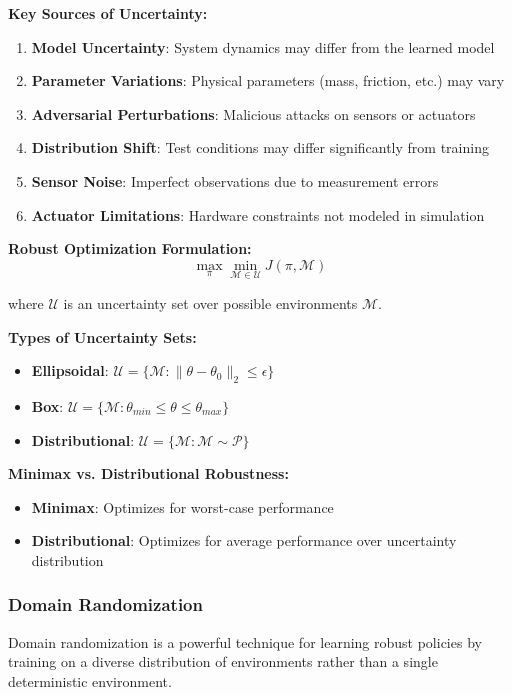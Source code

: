 \documentclass[12pt]{article}
\begin{document}
{{{{\textbf{Key Sources of Uncertainty:}
\begin{enumerate}
\item \textbf{Model Uncertainty}: System dynamics may differ from the learned model
\item \textbf{Parameter Variations}: Physical parameters (mass, friction, etc.) may vary
\item \textbf{Adversarial Perturbations}: Malicious attacks on sensors or actuators
\item \textbf{Distribution Shift}: Test conditions may differ significantly from training
\item \textbf{Sensor Noise}: Imperfect observations due to measurement errors
\item \textbf{Actuator Limitations}: Hardware constraints not modeled in simulation
\end{enumerate}

\textbf{Robust Optimization Formulation:}
\begin{equation}
\max_\pi \min_{\mathcal{M} \in \mathcal{U}} J(\pi, \mathcal{M})
\end{equation}

where $\mathcal{U}$ is an uncertainty set over possible environments $\mathcal{M}$.

\textbf{Types of Uncertainty Sets:}
\begin{itemize}
\item \textbf{Ellipsoidal}: $\mathcal{U} = \{\mathcal{M} : \|\theta - \theta_0\|_2 \leq \epsilon\}$
\item \textbf{Box}: $\mathcal{U} = \{\mathcal{M} : \theta_{min} \leq \theta \leq \theta_{max}\}$
\item \textbf{Distributional}: $\mathcal{U} = \{\mathcal{M} : \mathcal{M} \sim \mathcal{P}\}$
\end{itemize}

\textbf{Minimax vs. Distributional Robustness:}
\begin{itemize}
\item \textbf{Minimax}: Optimizes for worst-case performance
\item \textbf{Distributional}: Optimizes for average performance over uncertainty distribution
\end{itemize}

\subsubsection{Domain Randomization}

Domain randomization is a powerful technique for learning robust policies by training on a diverse distribution of environments rather than a single deterministic environment.

}}}}
\end{document}
